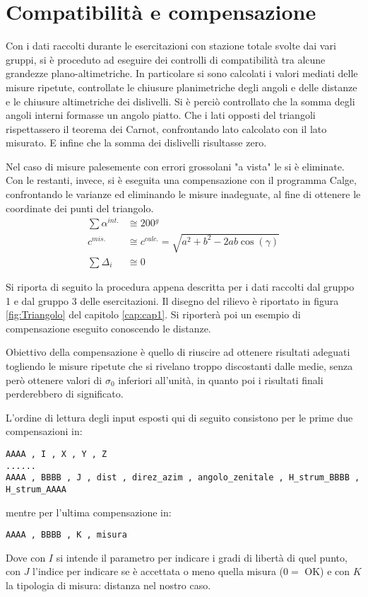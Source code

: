 \chapter{Compatibilità e compensazione}\label{cap:cap4}
Con i dati raccolti durante le esercitazioni con stazione totale svolte dai vari gruppi, si è proceduto ad eseguire dei controlli di compatibilità tra alcune grandezze plano-altimetriche.
In particolare si sono calcolati i valori mediati delle misure ripetute, controllate le chiusure planimetriche degli angoli e delle distanze e le chiusure altimetriche dei dislivelli.
Si è perciò controllato che la somma degli angoli interni formasse un angolo piatto. 
Che i lati opposti del triangoli rispettassero il teorema dei Carnot, confrontando lato calcolato con il lato misurato. 
E infine che la somma dei dislivelli risultasse zero.

Nel caso di misure palesemente con errori grossolani "a vista" le si è eliminate.
Con le restanti, invece, si è eseguita una compensazione con il programma Calge, confrontando le varianze ed eliminando le misure inadeguate, al fine di ottenere le coordinate dei punti del triangolo. 
\begin{align}
	\sum \alpha^{int.} &\cong \si{200}{^g} \label{eq:somma200}\\
	c^{mis.} &\cong c^{calc.} = \sqrt{a^2 + b^2 - 2ab\cos(\gamma)} \label{eq:carnot}\\
	\sum \Delta_i &\cong 0 \label{eq:somma0}
\end{align}

Si riporta di seguito la procedura appena descritta per i dati raccolti dal gruppo 1 e dal gruppo 3 delle esercitazioni. Il disegno del rilievo è riportato in figura \ref{fig:Triangolo} del capitolo \ref{cap:cap1}. Si riporterà poi un esempio di compensazione eseguito conoscendo le distanze.

Obiettivo della compensazione è quello di riuscire ad ottenere risultati adeguati togliendo le misure ripetute che si rivelano troppo discostanti dalle medie, senza però ottenere valori di $\sigma_0$ inferiori all'unità, in quanto poi i risultati finali perderebbero di significato. 

L'ordine di lettura degli input esposti qui di seguito consistono per le prime due compensazioni in:
\begin{lstlisting}
AAAA , I , X , Y , Z  
......
AAAA , BBBB , J , dist , direz_azim , angolo_zenitale , H_strum_BBBB , H_strum_AAAA
\end{lstlisting}
mentre per l'ultima compensazione in:
\begin{lstlisting}
AAAA , BBBB , K , misura
\end{lstlisting}
Dove con $I$ si intende il parametro per indicare i gradi di libertà di quel punto, con $J$ l'indice per indicare se è accettata o meno quella misura ($0 = $ OK) e con $K$ la tipologia di misura: distanza nel nostro caso.
